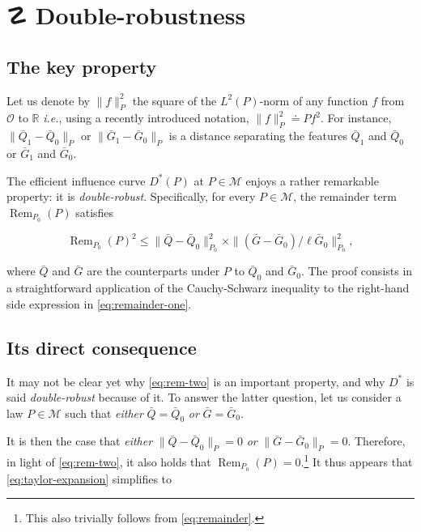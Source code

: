 \documentclass[11pt,openright,twoside]{book}
\DeclareMathOperator{\Rem}{Rem}
\DeclareRobustCommand{\stixdanger}{%
  {\usefont{U}{stixbbit}{m}{it}\symbol{"F6}}%
}
\newcommand{\bbR}{\mathbb{R}}
\newcommand{\defq}{\doteq}
\newcommand{\calM}{\mathcal{M}}
\newcommand{\calO}{\mathcal{O}}
\newcommand{\Gbar}{\bar{G}}
\newcommand{\Qbar}{\bar{Q}}
\theoremstyle{definition}
\theoremstyle{definition}
\theoremstyle{definition}
\theoremstyle{remark}
\begin{document}
\hypertarget{def-double-robustness}{%
\section{\texorpdfstring{☡ \stixdanger{} Double-robustness}{☡  Double-robustness}}\label{def-double-robustness}}

\hypertarget{the-key-property}{%
\subsection{The key property}\label{the-key-property}}

Let us denote by \(\|f\|_{P}^{2}\) the square of the \(L^{2}(P)\)-norm of any
function \(f\) from \(\calO\) to \(\bbR\) \emph{i.e.}, using a recently introduced
notation, \(\|f\|_{P}^{2} \defq Pf^{2}\). For instance, \(\|\Qbar_{1} - \Qbar_{0}\|_{P}\) or \(\|\Gbar_{1} - \Gbar_{0}\|_{P}\) is a distance separating
the features \(\Qbar_{1}\) and \(\Qbar_{0}\) or \(\Gbar_{1}\) and \(\Gbar_{0}\).

The efficient influence curve \(D^{*}(P)\) at \(P \in \calM\) enjoys a rather
remarkable property: it is \emph{double-robust}. Specifically, for every \(P \in \calM\), the remainder term \(\Rem_{P_{0}} (P)\) satisfies

\begin{equation} 
\Rem_{P_{0}}   (P)^{2}  \leq   \|\Qbar   -
\Qbar_{0}\|_{P_0}^{2}  \times   \|(\Gbar  -  \Gbar_{0})/\ell\Gbar_{0}\|_{P_0}^{2},
\label{eq:rem-two}
\end{equation}

where \(\Qbar\) and \(\Gbar\) are the counterparts under \(P\) to \(\Qbar_{0}\) and
\(\Gbar_{0}\). The proof consists in a straightforward application of the
Cauchy-Schwarz inequality to the right-hand side expression in
\eqref{eq:remainder-one}.

\hypertarget{direct-consequence}{%
\subsection{Its direct consequence}\label{direct-consequence}}

It may not be clear yet why \eqref{eq:rem-two} is an important property, and
why \(D^{*}\) is said \emph{double-robust} because of it. To answer the latter
question, let us consider a law \(P\in \calM\) such that \emph{either} \(\Qbar = \Qbar_{0}\) \emph{or} \(\Gbar = \Gbar_{0}\).

It is then the case that \emph{either} \(\|\Qbar - \Qbar_{0}\|_{P} = 0\) \emph{or}
\(\|\Gbar - \Gbar_{0}\|_{P} = 0\). Therefore, in light of \eqref{eq:rem-two}, it
also holds that \(\Rem_{P_{0}} (P) = 0\).\footnote{This also trivially follows from
  \eqref{eq:remainder}.} It thus appears that \eqref{eq:taylor-expansion}
simplifies to
\end{document}
